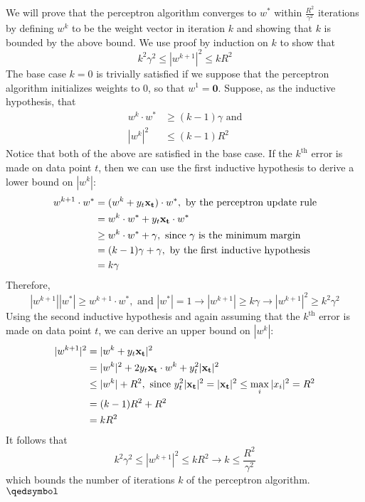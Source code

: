 \documentclass{article}
\begin{document}
We will prove that the perceptron algorithm converges to $ w^* $ within $ \frac{R^2}{\gamma^2} $ iterations by defining $ w^k $ to be the weight vector in iteration $ k $ and showing that $ k $ is bounded by the above bound.
\newline
We use proof by induction on $ k $ to show that 
$$ k^2 \gamma^2 \leq |w^{k + 1}|^2 \leq k R^2 $$
The base case $ k = 0 $ is trivially satisfied if we suppose that the perceptron algorithm initializes weights to 0, so that $ w^1 = \mathbf{0} $. Suppose, as the inductive hypothesis, that
$$ \begin{aligned}
	w^k \cdot w^* &\geq (k - 1) \gamma \text{ and} \\
	|w^k|^2 &\leq (k - 1) R^2
\end{aligned} $$
Notice that both of the above are satisfied in the base case. If the $ k^{\text{th}} $ error is made on data point $ t $, then we can use the first inductive hypothesis to derive a lower bound on $ |w^k| $:
$$ \begin{aligned}
	w^{k + 1} \cdot w^* &= (w^k + y_t \mathbf{x_t}) \cdot w^*, \text{ by the perceptron update rule} \\
	&= w^k \cdot w^* + y_t \mathbf{x_t} \cdot w^* \\
	&\geq w^k \cdot w^* + \gamma, \text{ since $ \gamma $ is the minimum margin} \\
	&= (k - 1) \gamma + \gamma, \text{ by the first inductive hypothesis} \\
	&= k \gamma
\end{aligned} $$
Therefore,
$$ |w^{k + 1}| |w^*| \geq w^{k + 1} \cdot w^*, \text{ and } |w^*| = 1 \rightarrow |w^{k + 1}| \geq k \gamma \rightarrow |w^{k + 1}|^2 \geq k^2 \gamma^2 $$
Using the second inductive hypothesis and again assuming that the $ k^{\text{th}} $ error is made on data point $ t $, we can derive an upper bound on $ |w^k| $:
$$ \begin{aligned} 
	|w^{k + 1}|^2 &= |w^k + y_t \mathbf{x_t}|^2 \\
	&= |w^k|^2 + 2 y_t \mathbf{x_t} \cdot w^k + y_t^2 |\mathbf{x_t}|^2 \\
	&\leq |w^k| + R^2, \text{ since $ y_t^2 |\mathbf{x_t}|^2 = |\mathbf{x_t}|^2 \leq \max_{i} |x_i|^2 = R^2 $} \\
	&= (k - 1) R^2 + R^2 \\
	&= k R^2
\end{aligned} $$
It follows that
$$ k^2 \gamma^2 \leq |w^{k + 1}|^2 \leq k R^2 \rightarrow k \leq \frac{R^2}{\gamma^2} $$
which bounds the number of iterations $ k $ of the perceptron algorithm. $ \qedsymbol $
\end{document}
